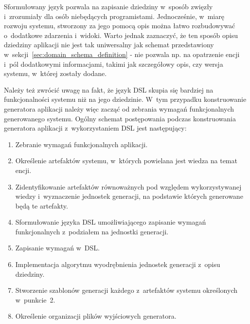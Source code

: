 Sformułowany język pozwala na zapisanie dziedziny w~sposób zwięzły i~zrozumiały dla osób niebędących programistami.
Jednocześnie, w~miarę rozwoju systemu, stworzony za jego pomocą opis można łatwo rozbudowywać o~dodatkowe zdarzenia i~widoki.
Warto jednak zaznaczyć, że ten sposób opisu dziedziny aplikacji nie jest tak uniwersalny jak schemat przedstawiony w~sekcji~\ref{sec:domain_schema_definition} - nie pozwala np. na opatrzenie encji i~pól dodatkowymi informacjami, takimi jak szczegółowy opis, czy wersja systemu, w~której zostały dodane.

Należy też zwrócić uwagę na fakt, że język DSL skupia się bardziej na funkcjonalności systemu niż na jego dziedzinie.
W~tym przypadku konstruowanie generatora aplikacji należy więc zacząć od zebrania wymagań funkcjonalnych generowanego systemu.
Ogólny schemat postępowania podczas konstruowania generatora aplikacji z~wykorzystaniem DSL jest następujący:

\begin{enumerate}
 \item Zebranie wymagań funkcjonalnych aplikacji.
 \item Określenie artefaktów systemu, w~których powielana jest wiedza na temat encji.
 \item Zidentyfikowanie artefaktów równoważnych pod względem wykorzystywanej wiedzy i~wyznaczenie jednostek generacji, na podstawie których generowane będą te artefakty.
 \item Sformułowanie języka DSL umożliwiającego zapisanie wymagań funkcjonalnych z~podziałem na jednostki generacji.
 \item Zapisanie wymagań w~DSL.
 \item Implementacja algorytmu wyodrębnienia jednostek generacji z~opisu dziedziny.
 \item Stworzenie szablonów generacji każdego z~artefaktów systemu określonych w~punkcie~2.
 \item Określenie organizacji plików wyjściowych generatora.
\end{enumerate}
